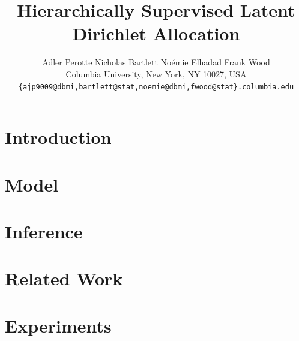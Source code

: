 \documentclass{article}
\title{Hierarchically Supervised Latent Dirichlet Allocation}
\author{
Adler Perotte\hspace{1cm} Nicholas Bartlett \hspace{1cm} No\'emie Elhadad \hspace{1cm} Frank Wood\\
Columbia University, New York, NY 10027, USA \\
\texttt{\{ajp9009@dbmi,bartlett@stat,noemie@dbmi,fwood@stat\}.columbia.edu}
}
\begin{document}
\maketitle

\begin{abstract}

\end{abstract}

\section{Introduction}
\label{sec:introduction}







\section{Model}
\label{sec:model}


\section{Inference}
\label{sec:inference}


\section{Related Work}

\label{sec:related_work} 


\section{Experiments}

\label{sec:experiments}

\end{document}
